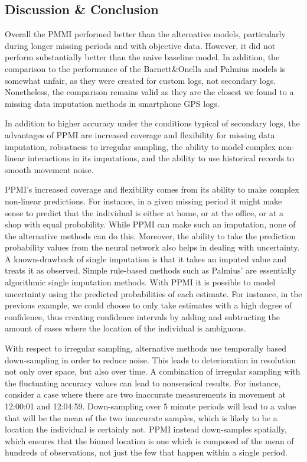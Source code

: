 \documentclass[man]{apa6}
\theoremstyle{definition}
\theoremstyle{definition}
\theoremstyle{definition}
\theoremstyle{remark}
\begin{document}
\subsection{Discussion \& Conclusion}\label{discussion-conclusion}

Overall the PMMI performed better than the alternative models,
particularly during longer missing periods and with objective data.
However, it did not perform substantially better than the naive baseline
model. In addition, the comparison to the performance of the
Barnett\&Onella and Palmius models is somewhat unfair, as they were
created for custom logs, not secondary logs. Nonetheless, the comparison
remains valid as they are the closest we found to a missing data
imputation methods in smartphone GPS logs.

In addition to higher accuracy under the conditions typical of secondary
logs, the advantages of PPMI are increased coverage and flexibility for
missing data imputation, robustness to irregular sampling, the ability
to model complex non-linear interactions in its imputations, and the
ability to use historical records to smooth movement noise.

PPMI's increased coverage and flexibility comes from its ability to make
complex non-linear predictions. For instance, in a given missing period
it might make sense to predict that the individual is either at home, or
at the office, or at a shop with equal probability. While PPMI can make
such an imputation, none of the alternative methods can do this.
Moreover, the ability to take the prediction probability values from the
neural network also helps in dealing with uncertainty. A known-drawback
of single imputation is that it takes an imputed value and treats it as
observed. Simple rule-based methods such as Palmius' are essentially
algorithmic single imputation methods. With PPMI it is possible to model
uncertainty using the predicted probabilities of each estimate. For
instance, in the previous example, we could choose to only take
estimates with a high degree of confidence, thus creating confidence
intervals by adding and subtracting the amount of cases where the
location of the individual is ambiguous.

With respect to irregular sampling, alternative methods use temporally
based down-sampling in order to reduce noise. This leads to
deterioration in resolution not only over space, but also over time. A
combination of irregular sampling with the fluctuating accuracy values
can lead to nonsensical results. For instance, consider a case where
there are two inaccurate measurements in movement at 12:00:01 and
12:04:59. Down-sampling over 5 minute periods will lead to a value that
will be the mean of the two inaccurate samples, which is likely to be a
location the individual is certainly not. PPMI instead down-samples
spatially, which ensures that the binned location is one which is
composed of the mean of hundreds of observations, not just the few that
happen within a single period.
\end{document}
